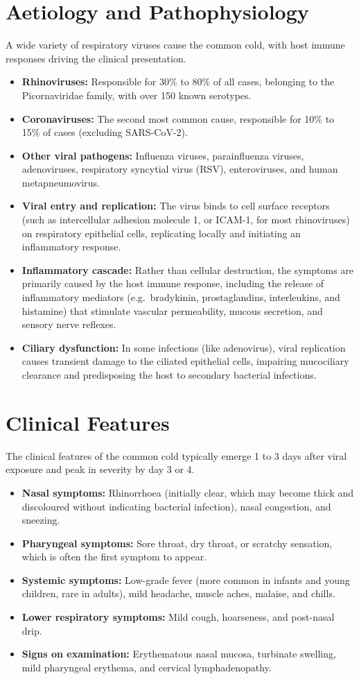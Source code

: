 \section*{Aetiology and Pathophysiology}
A wide variety of respiratory viruses cause the common cold, with host immune responses driving the clinical presentation.
\begin{itemize}
    \item \textbf{Rhinoviruses:} Responsible for 30\% to 80\% of all cases, belonging to the Picornaviridae family, with over 150 known serotypes.
    \item \textbf{Coronaviruses:} The second most common cause, responsible for 10\% to 15\% of cases (excluding SARS-CoV-2).
    \item \textbf{Other viral pathogens:} Influenza viruses, parainfluenza viruses, adenoviruses, respiratory syncytial virus (RSV), enteroviruses, and human metapneumovirus.
    \item \textbf{Viral entry and replication:} The virus binds to cell surface receptors (such as intercellular adhesion molecule 1, or ICAM-1, for most rhinoviruses) on respiratory epithelial cells, replicating locally and initiating an inflammatory response.
    \item \textbf{Inflammatory cascade:} Rather than cellular destruction, the symptoms are primarily caused by the host immune response, including the release of inflammatory mediators (e.g.\ bradykinin, prostaglandins, interleukins, and histamine) that stimulate vascular permeability, mucous secretion, and sensory nerve reflexes.
    \item \textbf{Ciliary dysfunction:} In some infections (like adenovirus), viral replication causes transient damage to the ciliated epithelial cells, impairing mucociliary clearance and predisposing the host to secondary bacterial infections.
\end{itemize}

\section*{Clinical Features}
The clinical features of the common cold typically emerge 1 to 3 days after viral exposure and peak in severity by day 3 or 4.
\begin{itemize}
    \item \textbf{Nasal symptoms:} Rhinorrhoea (initially clear, which may become thick and discoloured without indicating bacterial infection), nasal congestion, and sneezing.
    \item \textbf{Pharyngeal symptoms:} Sore throat, dry throat, or scratchy sensation, which is often the first symptom to appear.
    \item \textbf{Systemic symptoms:} Low-grade fever (more common in infants and young children, rare in adults), mild headache, muscle aches, malaise, and chills.
    \item \textbf{Lower respiratory symptoms:} Mild cough, hoarseness, and post-nasal drip.
    \item \textbf{Signs on examination:} Erythematous nasal mucosa, turbinate swelling, mild pharyngeal erythema, and cervical lymphadenopathy.
\end{itemize}

